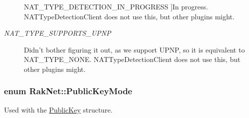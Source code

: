 \begin{Desc}
\begin{description}
{\hypertarget{namespace_rak_net_a81848fd95488939c0b3e217209f31139abd9c6bf5948fea28bf8d8513a4ef1b1d}{N\-A\-T\-\_\-\-T\-Y\-P\-E\-\_\-\-D\-E\-T\-E\-C\-T\-I\-O\-N\-\_\-\-I\-N\-\_\-\-P\-R\-O\-G\-R\-E\-S\-S}\label{namespace_rak_net_a81848fd95488939c0b3e217209f31139abd9c6bf5948fea28bf8d8513a4ef1b1d}
}]In progress. N\-A\-T\-Type\-Detection\-Client does not use this, but other plugins might. \item[{\em 
\hypertarget{namespace_rak_net_a81848fd95488939c0b3e217209f31139a16b9a0a7400130f9f1b046426a8ae7d0}{N\-A\-T\-\_\-\-T\-Y\-P\-E\-\_\-\-S\-U\-P\-P\-O\-R\-T\-S\-\_\-\-U\-P\-N\-P}\label{namespace_rak_net_a81848fd95488939c0b3e217209f31139a16b9a0a7400130f9f1b046426a8ae7d0}
}]Didn't bother figuring it out, as we support U\-P\-N\-P, so it is equivalent to N\-A\-T\-\_\-\-T\-Y\-P\-E\-\_\-\-N\-O\-N\-E. N\-A\-T\-Type\-Detection\-Client does not use this, but other plugins might. \end{description}
\end{Desc}
\hypertarget{namespace_rak_net_a415b479158fd361610df230a53b35b02}{
\subsubsection[{Public\-Key\-Mode}]{\setlength{\rightskip}{0pt plus 5cm}enum {\bf Rak\-Net\-::\-Public\-Key\-Mode}}}\label{namespace_rak_net_a415b479158fd361610df230a53b35b02}


Used with the \hyperlink{struct_rak_net_1_1_public_key}{Public\-Key} structure. 

